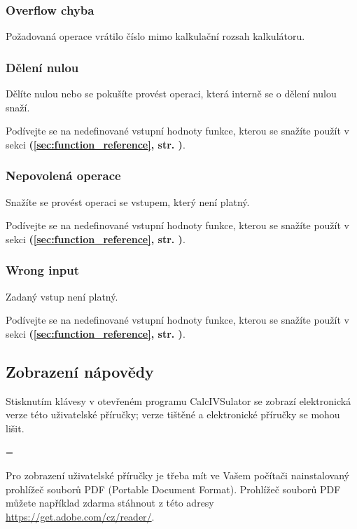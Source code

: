 \documentclass[a5paper,8pt,twoside]{extarticle}
\newenvironment{infoBox}
  {\par\begin{mdframed}[linewidth=1pt,linecolor=black]%
    \begin{list}{}{\leftmargin=1cm
                   \labelwidth=\leftmargin}\item[\Large\lefthand]}
  {\end{list}\end{mdframed}\par}
\newcommand*\nref[1]{\textbf{(\ref{#1}, str. \pageref{#1})}}
\begin{document}
    \subsubsection{Overflow chyba}
    Požadovaná operace vrátilo číslo mimo kalkulační rozsah kalkulátoru.

    \subsubsection{Dělení nulou}
    Dělíte nulou nebo se pokušíte provést operaci, která interně se o dělení nulou snaží.

    Podívejte se na nedefinované vstupní hodnoty funkce, kterou se snažíte použít v sekci  \nref{sec:function_reference}.

    \subsubsection{Nepovolená operace}
    Snažíte se provést operaci se vstupem, který není platný.
    
    Podívejte se na nedefinované vstupní hodnoty funkce, kterou se snažíte použít v sekci  \nref{sec:function_reference}.

    \subsubsection{Wrong input}
    Zadaný vstup není platný.

    Podívejte se na nedefinované vstupní hodnoty funkce, kterou se snažíte použít v sekci  \nref{sec:function_reference}.    

    \subsection{Zobrazení nápovědy}
    Stisknutím klávesy  v otevřeném programu CalcIVSulator se zobrazí elektronická verze této uživatelské příručky; verze tištěné a elektronické příručky se mohou lišit.

    \begin{infoBox}
        Pro zobrazení uživatelské příručky je třeba mít ve Vašem počítači nainstalovaný prohlížeč souborů PDF (Portable Document Format). Prohlížeč souborů PDF můžete například zdarma stáhnout z této adresy \url{https://get.adobe.com/cz/reader/}.
    \end{infoBox}
\end{document}
